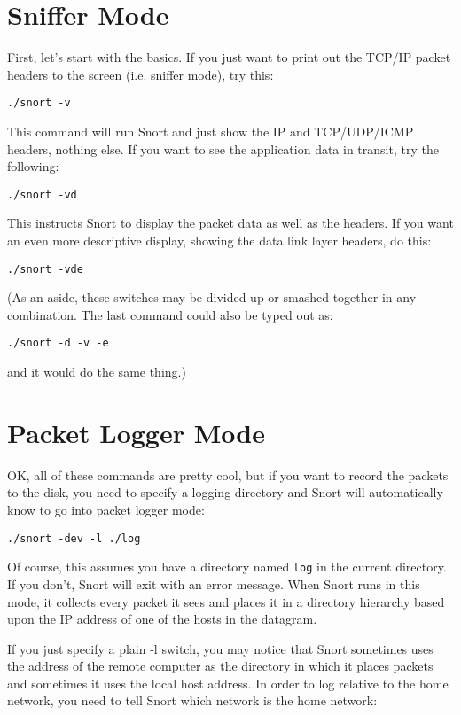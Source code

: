 \documentclass[english]{report}
\begin{document}
\section{Sniffer Mode}

First, let's start with the basics. If you just want to print out
the TCP/IP packet headers to the screen (i.e. sniffer mode), try this:

\begin{verbatim}
./snort -v
\end{verbatim}
This command will run Snort and just show the IP and TCP/UDP/ICMP
headers, nothing else. If you want to see the application data in
transit, try the following:

\begin{verbatim}
./snort -vd
\end{verbatim}
This instructs Snort to display the packet data as well as the headers.
If you want an even more descriptive display, showing the data link
layer headers, do this:

\begin{verbatim}
./snort -vde
\end{verbatim}
(As an aside, these switches may be divided up or smashed together
in any combination. The last command could also be typed out as:

\begin{verbatim}
./snort -d -v -e
\end{verbatim}
and it would do the same thing.)


\section{Packet Logger Mode}

OK, all of these commands are pretty cool, but if you want to record
the packets to the disk, you need to specify a logging directory and
Snort will automatically know to go into packet logger mode:

\begin{verbatim}
./snort -dev -l ./log
\end{verbatim}
Of course, this assumes you have a directory named \verb!log!
in the current directory. If you don't, Snort will exit with an error
message. When Snort runs in this mode, it collects every packet it
sees and places it in a directory hierarchy based upon the IP address
of one of the hosts in the datagram.

If you just specify a plain -l switch, you may
notice that Snort sometimes uses the address of the remote computer
as the directory in which it places packets and sometimes it uses
the local host address. In order to log relative to the home network,
you need to tell Snort which network is the home network:
\end{document}
